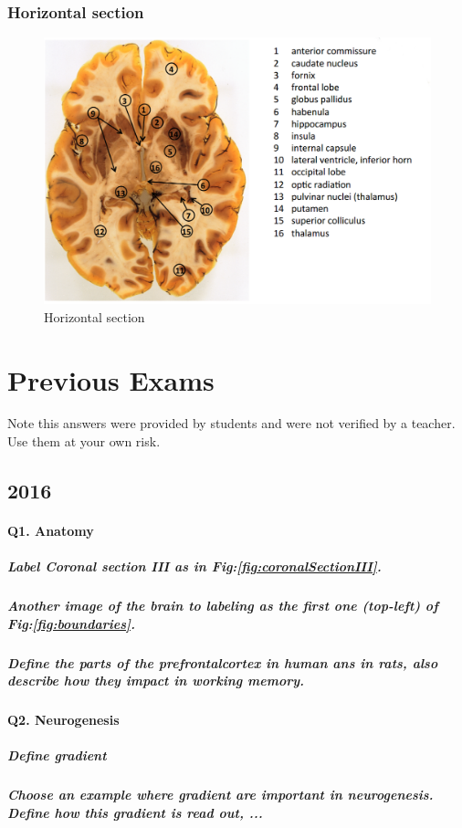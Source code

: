 \documentclass[12pt,article,oneside,a4paper]{memoir}
\begin{document}
\subsubsection{Horizontal section}
\begin{figure}[H]
	\centering
  	\includegraphics[width=\linewidth]{imgs/horizontal-section-answer.png}
	\caption{Horizontal section}
  	\label{fig:horizontalSection-answer}
\end{figure}

\newpage
\section{Previous Exams}
Note this answers were provided by students and were not verified by a teacher. Use them at your own risk.

\subsection{2016}
\paragraph{Q1. Anatomy}
\subparagraph{Label Coronal section III as in Fig:\ref{fig:coronalSectionIII}.}
\subparagraph{Another image of the brain to labeling as the first one (top-left) of Fig:\ref{fig:boundaries}.}
\subparagraph{Define the parts of the prefrontalcortex in human ans in rats, also describe how they impact in working memory.}
\paragraph{Q2. Neurogenesis}
\subparagraph{Define gradient}
\subparagraph{Choose an example where gradient are important in neurogenesis. Define how this gradient is read out, ... }
\end{document}
